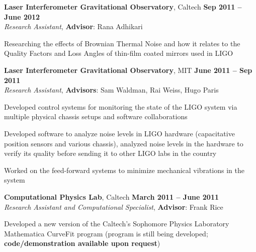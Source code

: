 \documentclass[margin,line]{resume}
\begin{document}
\begin{resume}

\newpage

\textbf{Laser Interferometer Gravitational Observatory}, Caltech \hfill \textbf{Sep 2011 -- June 2012}\\
\textsl{Research Assistant}, \textbf{Advisor}: Rana Adhikari
\begin{list2}
  \item Researching the effects of Brownian Thermal Noise and how it relates to the Quality Factors and Loss Angles of thin-film coated mirrors used in LIGO
\end{list2}

\textbf{Laser Interferometer Gravitational Observatory}, MIT \hfill \textbf{June 2011 -- Sep 2011}\\
\textsl{Research Assistant}, \textbf{Advisors}: Sam Waldman, Rai Weiss, Hugo Paris
\begin{list2}
  \item Developed control systems for monitoring the state of the LIGO system via multiple physical chassis setups and software collaborations
  \item Developed software to analyze noise levels in LIGO hardware (capacitative position sensors and various chassis), analyzed noise levels in the hardware to verify its quality before sending it to other LIGO labs in the country
  \item Worked on the feed-forward systems to minimize mechanical vibrations in the system
\end{list2}

\textbf{Computational Physics Lab}, Caltech \hfill \textbf{March 2011 -- June 2011}\\
\textsl{Research Assistant and Computational Specialist}, \textbf{Advisor}: Frank Rice
\begin{list2}
  \item Developed a new version of the Caltech's Sophomore Physics Laboratory Mathematica CurveFit program (program is still being developed; \textbf{code/demonstration available upon request})
\end{list2}


\end{resume}
\end{document}
